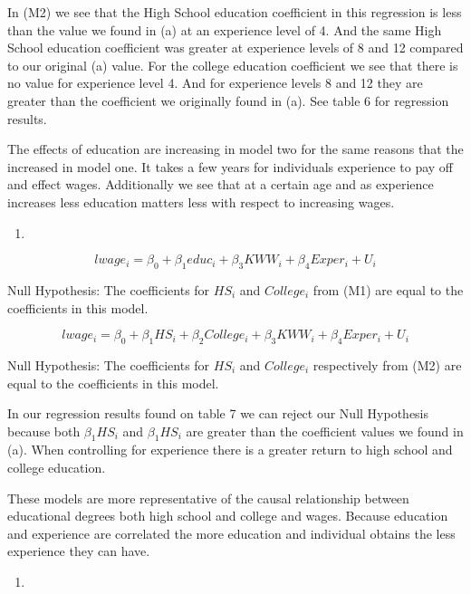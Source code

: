 \documentclass[
  12pt,
  landscape]{article}
\begin{document}
In (M2) we see that the High School education coefficient in this
regression is less than the value we found in (a) at an experience level
of 4. And the same High School education coefficient was greater at
experience levels of 8 and 12 compared to our original (a) value. For
the college education coefficient we see that there is no value for
experience level 4. And for experience levels 8 and 12 they are greater
than the coefficient we originally found in (a). See table 6 for
regression results.

The effects of education are increasing in model two for the same
reasons that the increased in model one. It takes a few years for
individuals experience to pay off and effect wages. Additionally we see
that at a certain age and as experience increases less education matters
less with respect to increasing wages.

\begin{enumerate}
\def\labelenumi{(\alph{enumi})}
\setcounter{enumi}{6}
\item
\end{enumerate}

\[
lwage_i = \beta_0 + \beta_1educ_i + \beta_3KWW_i + \beta_4Exper_i + U_i
\]

Null Hypothesis: The coefficients for \({HS_i}\) and \({College_i}\)
from (M1) are equal to the coefficients in this model.

\[
lwage_i = \beta_0 + \beta_1HS_i + \beta_2College_i + \beta_3KWW_i + \beta_4Exper_i + U_i
\]

Null Hypothesis: The coefficients for \({HS_i}\) and \({College_i}\)
respectively from (M2) are equal to the coefficients in this model.

In our regression results found on table 7 we can reject our Null
Hypothesis because both \({\beta_1HS_i}\) and \({\beta_1HS_i}\) are
greater than the coefficient values we found in (a). When controlling
for experience there is a greater return to high school and college
education.

These models are more representative of the causal relationship between
educational degrees both high school and college and wages. Because
education and experience are correlated the more education and
individual obtains the less experience they can have.

\begin{enumerate}
\def\labelenumi{(\alph{enumi})}
\setcounter{enumi}{7}
\item
\end{enumerate}
\end{document}
